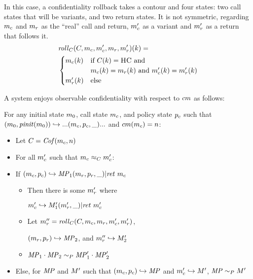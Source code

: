 \documentclass[conference]{IEEEtran}
\begin{document}
      In this case, a confidentiality rollback takes a contour and four states: two call states
      that will be variants, and two return states. It is not symmetric, regarding \(m_c\) and \(m_r\)
      as the ``real'' call and return, \(m_c'\) as a variant and \(m_r'\) as a return that follows it.
      \[\begin{split}
        & \mathit{roll}_C(C,m_c,m_c',m_r,m_r')(k) = \\
        & \begin{cases}
          m_c(k) & \text{if } C(k) = \textsc{HC} \text{ and } \\
                  & m_c(k) = m_r(k) \text{ and }
                    m_c'(k) = m_r'(k) \\
          m_r'(k) & \text{else} \\
        \end{cases}
      \end{split}\]

      A system enjoys observable confidentiality with respect to \(cm\) as follows:

      For any initial state \(m_0\), call state \(m_c\), and policy state \(p_c\) such that
      \((m_0,\mathit{pinit}(m_0)) \hookrightarrow ... (m_c,p_c,\_) ...\) and
      \(cm(m_c) = n\):

      \begin{itemize}
        \item Let \(C = \mathit{Cof}(m_c,n)\)
        \item For all \(m_c'\) such that \(m_c \approx_C m_c'\):
        \item If \((m_c,p_c) \hookrightarrow \mathit{MP}_1 (m_r,p_r,\_) | \mathit{ret}\ m_c\)
          \begin{itemize}
            \item Then there is some \(m_r'\) where

              \(m_c' \hookrightarrow M_1' (m_r',\_) | \mathit{ret}\ m_c'\)
            \item Let \(m_r'' = \mathit{roll}_C(C,m_c,m_r,m_c',m_r')\),

              \((m_r,p_r) \hookrightarrow \mathit{MP}_2\), and \(m_r'' \hookrightarrow M_2'\)
            \item \(\mathit{MP}_1 \cdot \mathit{MP}_2 \sim_P \mathit{MP}_1' \cdot \mathit{MP}_2'\)
          \end{itemize}
        \item Else, for \(\mathit{MP}\) and \(M'\) such that \((m_c,p_c) \hookrightarrow \mathit{MP}\)
          and \(m_c' \hookrightarrow M'\), \(\mathit{MP} \sim_P M'\)
      \end{itemize}

\end{document}

